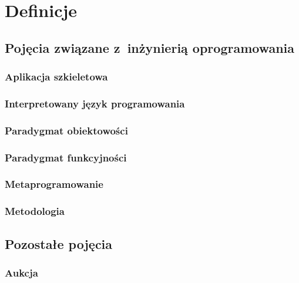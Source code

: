 \section{Definicje} \label{definicje}

\subsection{Pojęcia związane z~inżynierią oprogramowania} \label{definicje.inz_op}


\subsubsection{Aplikacja szkieletowa} \label{definicje.inz_op.framework}


\subsubsection{Interpretowany język programowania} \label{definicje.inz_op.jez_inter}


\subsubsection{Paradygmat obiektowości} \label{definicje.inz_op.jez_obj}


\subsubsection{Paradygmat funkcyjności} \label{definicje.inz_op.jez_fun}


\subsubsection{Metaprogramowanie} \label{definicje.inz_op.metaprog}


\subsubsection{Metodologia} \label{definicje.inz_op.metodologia}


\subsection{Pozostałe pojęcia}

\subsubsection{Aukcja} \label{definicje.inne.aukcja}

